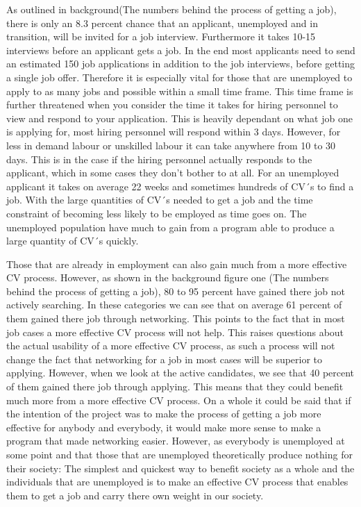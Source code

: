 As outlined in background(The numbers behind the process of getting a job), there is only an 8.3 percent chance that an applicant, unemployed and in transition, will be invited for a job interview.
Furthermore it takes 10-15 interviews before an applicant gets a job.
In the end most applicants need to send an estimated 150 job applications in addition to the job interviews, before getting a single job offer.
Therefore it is especially vital for those that are unemployed to apply to as many jobs and possible within a small time frame. 
This time frame is further threatened when you consider the time it takes for hiring personnel to view and respond to your application.
This is heavily dependant on what job one is applying for, most hiring personnel will respond within 3 days. 
However, for less in demand labour or unskilled labour it can take anywhere from 10 to 30 days. 
This is in the case if the hiring personnel actually responds to the applicant, which in some cases they don't bother to at all.
For an unemployed applicant it takes on average 22 weeks and sometimes hundreds of CV´s to find a job. 
With the large quantities of CV´s needed to get a job and the time constraint of becoming less likely to be employed as time goes on.
The unemployed population have much to gain from a program able to produce a large quantity of CV´s quickly.

Those that are already in employment can also gain much from a more effective CV process.
However, as shown in the background figure one (The numbers behind the process of getting a job), 80 to 95 percent have gained there job not actively searching.
In these categories we can see that on average 61 percent of them gained there job through networking. 
This points to the fact that in most job cases a more effective CV process will not help.
This raises questions about the actual usability of a more effective CV process, as such a process will not change the fact that networking for a job in most cases will be superior to applying.
However, when we look at the active candidates, we see that 40 percent of them gained there job through applying. 
This means that they could benefit much more from a more effective CV process.
On a whole it could be said that if the intention of the project was to make the process of getting a job more effective for anybody and everybody, it would make more sense to make a program that made networking easier.
However, as everybody is unemployed at some point and that those that are unemployed theoretically produce nothing for their society:
The simplest and quickest way to benefit society as a whole and the individuals that are unemployed is to make an effective CV process that enables them to get a job and carry there own weight in our society.

